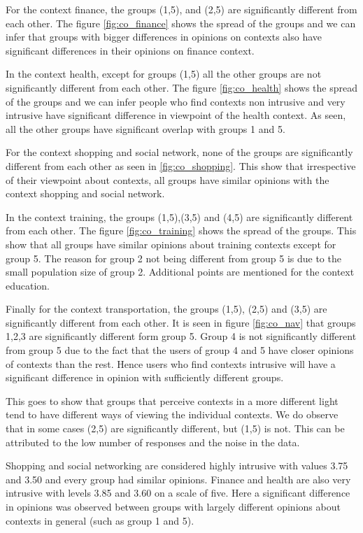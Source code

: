For the context finance, the groups (1,5), and (2,5) are significantly different from each other. The figure \ref{fig:co_finance} shows the spread of the groups and we can infer that groups with bigger differences in opinions on contexts also have significant differences in their opinions on finance context.

In the context health, except for groups (1,5) all the other groups are not significantly different from each other. The figure \ref{fig:co_health} shows the spread of the groups and we can infer people who find contexts non intrusive and very intrusive have significant difference in viewpoint of the health context. As seen, all the other groups have significant overlap with groups 1 and 5.

For the context shopping and social network, none of the groups are significantly different from each other as seen in \ref{fig:co_shopping}. This show that irrespective of their viewpoint about contexts, all groups have similar opinions with the context shopping and social network.

In the context training, the groups (1,5),(3,5) and (4,5) are significantly different from each other. The figure \ref{fig:co_training} shows the spread of the groups. This show that all groups have similar opinions about training contexts except for group 5. The reason for group 2 not being different from group 5 is due to the small population size of group 2. Additional points are mentioned for the context education.

Finally for the context transportation, the groups (1,5), (2,5) and (3,5) are significantly different from each other. It is seen in figure \ref{fig:co_nav} that groups 1,2,3 are significantly different form group 5. Group 4 is not significantly different from group 5 due to the fact that the users of group 4 and 5 have closer opinions of contexts than the rest. Hence users who find contexts intrusive will have a significant difference in opinion with sufficiently different groups.

This goes to show that groups that perceive contexts in a more different light tend to have different ways of viewing the individual contexts. We do observe that in some cases (2,5) are significantly different, but (1,5) is not. This can be attributed to the low number of responses
and the noise in the data. 

Shopping and social networking are considered highly intrusive with values 3.75 and 3.50 and every group had similar opinions. Finance and health are also very intrusive with levels 3.85 and 3.60 on a scale of five. Here a significant difference in opinions was observed between groups with largely different opinions about contexts in general (such as group 1 and 5).

